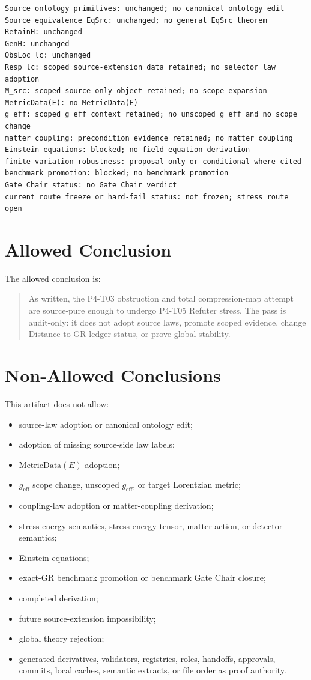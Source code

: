 \documentclass[11pt]{article}
\newcommand{\MetricData}{\mathrm{MetricData}}
\newcommand{\geff}{g_{\mathrm{eff}}}
\begin{document}
\begin{verbatim}
Source ontology primitives: unchanged; no canonical ontology edit
Source equivalence EqSrc: unchanged; no general EqSrc theorem
RetainH: unchanged
GenH: unchanged
ObsLoc_lc: unchanged
Resp_lc: scoped source-extension data retained; no selector law adoption
M_src: scoped source-only object retained; no scope expansion
MetricData(E): no MetricData(E)
g_eff: scoped g_eff context retained; no unscoped g_eff and no scope change
matter coupling: precondition evidence retained; no matter coupling
Einstein equations: blocked; no field-equation derivation
finite-variation robustness: proposal-only or conditional where cited
benchmark promotion: blocked; no benchmark promotion
Gate Chair status: no Gate Chair verdict
current route freeze or hard-fail status: not frozen; stress route open
\end{verbatim}

\section{Allowed Conclusion}

The allowed conclusion is:

\begin{quote}
As written, the P4-T03 obstruction and total compression-map attempt are
source-pure enough to undergo P4-T05 Refuter stress. The pass is audit-only:
it does not adopt source laws, promote scoped evidence, change Distance-to-GR
ledger status, or prove global stability.
\end{quote}

\section{Non-Allowed Conclusions}

This artifact does not allow:

\begin{itemize}[leftmargin=*]
\item source-law adoption or canonical ontology edit;
\item adoption of missing source-side law labels;
\item \(\MetricData(E)\) adoption;
\item \(\geff\) scope change, unscoped \(\geff\), or target Lorentzian metric;
\item coupling-law adoption or matter-coupling derivation;
\item stress-energy semantics, stress-energy tensor, matter action, or
  detector semantics;
\item Einstein equations;
\item exact-GR benchmark promotion or benchmark Gate Chair closure;
\item completed derivation;
\item future source-extension impossibility;
\item global theory rejection;
\item generated derivatives, validators, registries, roles, handoffs,
  approvals, commits, local caches, semantic extracts, or file order as proof
  authority.
\end{itemize}
\end{document}
